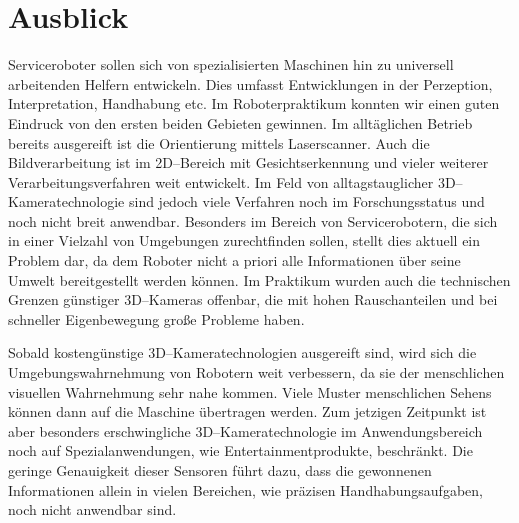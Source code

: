 \section{Ausblick}
\authorsection{\editorabel}
Serviceroboter sollen sich von spezialisierten Maschinen hin zu universell arbeitenden Helfern entwickeln.
Dies umfasst Entwicklungen in der Perzeption, Interpretation, Handhabung etc.
Im Roboterpraktikum konnten wir einen guten Eindruck von den ersten beiden Gebieten gewinnen.
Im alltäglichen Betrieb bereits ausgereift ist die Orientierung mittels Laserscanner.
Auch die Bildverarbeitung ist im 2D--Bereich mit Gesichtserkennung und vieler weiterer Verarbeitungsverfahren weit entwickelt.
Im Feld von alltagstauglicher 3D--Kameratechnologie sind jedoch viele Verfahren noch im Forschungsstatus und noch nicht breit anwendbar.
Besonders im Bereich von Servicerobotern, die sich in einer Vielzahl von Umgebungen zurechtfinden sollen, stellt dies aktuell ein Problem dar, da dem Roboter nicht a priori alle Informationen über seine Umwelt bereitgestellt werden können.
Im Praktikum wurden auch die technischen Grenzen günstiger 3D--Kameras offenbar, die mit hohen Rauschanteilen und bei schneller Eigenbewegung große Probleme haben.

Sobald kostengünstige 3D--Kameratechnologien ausgereift sind, wird sich die Umgebungswahrnehmung von Robotern weit verbessern, da sie der menschlichen visuellen Wahrnehmung sehr nahe kommen.
Viele Muster menschlichen Sehens können dann auf die Maschine übertragen werden.
Zum jetzigen Zeitpunkt ist aber besonders erschwingliche 3D--Kameratechnologie im Anwendungsbereich noch auf Spezialanwendungen, wie Entertainmentprodukte, beschränkt.
Die geringe Genauigkeit dieser Sensoren führt dazu, dass die gewonnenen Informationen allein in vielen Bereichen, wie präzisen Handhabungsaufgaben, noch nicht anwendbar sind.
